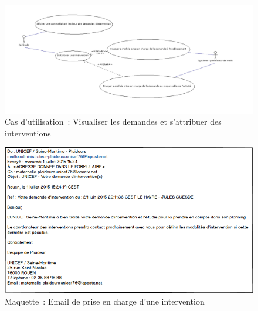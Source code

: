 \begin{figure}[H]
	\centering
	\includegraphics[scale=0.4]{images/casDUtilisation/fonctionnalite5Attribution.png}
	 \caption{Cas d'utilisation~: Visualiser les demandes et s'attribuer des interventions}
	 \label{visualiserESAttribuer}
\end{figure}

\begin{figure}[H]
	\centering
	\includegraphics[scale=0.675]{images/maquettes/fonctionnalite5MailDePriseEnCharge.png}
	\caption{Maquette~: Email de prise en charge d'une intervention}
	\label{courrielPrisCharge}
\end{figure}
